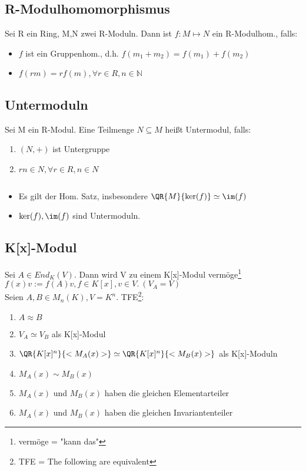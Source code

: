 \subsection{R-Modulhomomorphismus}
\begin{definition}
Sei R ein Ring, M,N zwei R-Moduln. Dann ist $f:M\mapsto N$ ein R-Modulhom., falls:
\begin{itemize}
	\item $f$ ist ein Gruppenhom., d.h. $f(m_1+m_2) = f(m_1)+f(m_2)$
	\item $f(rm) = rf(m), \forall r \in R, n\in \mathbb{N}$
\end{itemize}
\end{definition}

\subsection{Untermoduln}
\begin{definition}
Sei M ein R-Modul. Eine Teilmenge $N \subseteq M$ heißt Untermodul, falls:
\begin{enumerate}
	\item $(N,+)$ ist Untergruppe
	\item $rn \in N, \forall r \in R, n\in N$
\end{enumerate}
\end{definition}
\begin{remark}
$~~$
\begin{itemize}
	\item Es gilt der Hom. Satz, insbesondere $\QR{M}{\ker(f)} \simeq \im(f)$
	\item $\ker(f),\im(f)$ sind Untermoduln.
\end{itemize}
\end{remark}

\subsection{K[x]-Modul}
\begin{theorem}
Sei $A \in End_K(V)$. Dann wird V zu einem K[x]-Modul vermöge\footnote{vermöge = "kann das"} $f(x)v := f(A)v, f\in K[x], v \in V.~(V_A=V)$\\
Seien $A,B \in M_n(K), V=K^n$. TFE\footnote{TFE = The following are equivalent}:
\begin{enumerate}
	\item $A \approx B$
	\item $V_A \simeq V_B$ als K[x]-Modul
	\item $\QR{K[x]^n}{<M_A(x)>} \simeq \QR{K[x]^n}{<M_B(x)>}$ als K[x]-Moduln
	\item $M_A(x) \sim M_B(x)$
	\item $M_A(x)$ und $M_B(x)$ haben die gleichen Elementarteiler
	\item $M_A(x)$ und $M_B(x)$ haben die gleichen Invariantenteiler
\end{enumerate}
\end{theorem}

